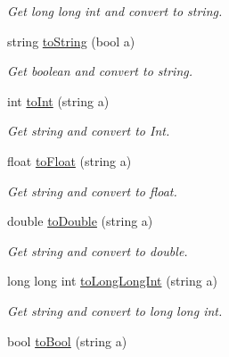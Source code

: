 \begin{DoxyCompactItemize}
\begin{DoxyCompactList}\small\item\em Get long long int and convert to string. \end{DoxyCompactList}\item 
string \hyperlink{namespacecommon_ad4970622daef780374effb8e47cf8134}{to\+String} (bool a)\hypertarget{namespacecommon_ad4970622daef780374effb8e47cf8134}{}\label{namespacecommon_ad4970622daef780374effb8e47cf8134}

\begin{DoxyCompactList}\small\item\em Get boolean and convert to string. \end{DoxyCompactList}\item 
int \hyperlink{namespacecommon_a31cd86456425bdd976cc622c5828e17f}{to\+Int} (string a)\hypertarget{namespacecommon_a31cd86456425bdd976cc622c5828e17f}{}\label{namespacecommon_a31cd86456425bdd976cc622c5828e17f}

\begin{DoxyCompactList}\small\item\em Get string and convert to Int. \end{DoxyCompactList}\item 
float \hyperlink{namespacecommon_affd5ec1cd7889f6e63c8fde2c1db389d}{to\+Float} (string a)\hypertarget{namespacecommon_affd5ec1cd7889f6e63c8fde2c1db389d}{}\label{namespacecommon_affd5ec1cd7889f6e63c8fde2c1db389d}

\begin{DoxyCompactList}\small\item\em Get string and convert to float. \end{DoxyCompactList}\item 
double \hyperlink{namespacecommon_adeca0735c7b49feb339967ada8cde286}{to\+Double} (string a)\hypertarget{namespacecommon_adeca0735c7b49feb339967ada8cde286}{}\label{namespacecommon_adeca0735c7b49feb339967ada8cde286}

\begin{DoxyCompactList}\small\item\em Get string and convert to double. \end{DoxyCompactList}\item 
long long int \hyperlink{namespacecommon_a9f91668221fb6afe69e9f8f517a4fe7c}{to\+Long\+Long\+Int} (string a)\hypertarget{namespacecommon_a9f91668221fb6afe69e9f8f517a4fe7c}{}\label{namespacecommon_a9f91668221fb6afe69e9f8f517a4fe7c}

\begin{DoxyCompactList}\small\item\em Get string and convert to long long int. \end{DoxyCompactList}\item 
bool \hyperlink{namespacecommon_aed690e352783334b551a1c74947cb101}{to\+Bool} (string a)\hypertarget{namespacecommon_aed690e352783334b551a1c74947cb101}{}\label{namespacecommon_aed690e352783334b551a1c74947cb101}


\end{DoxyCompactItemize}
